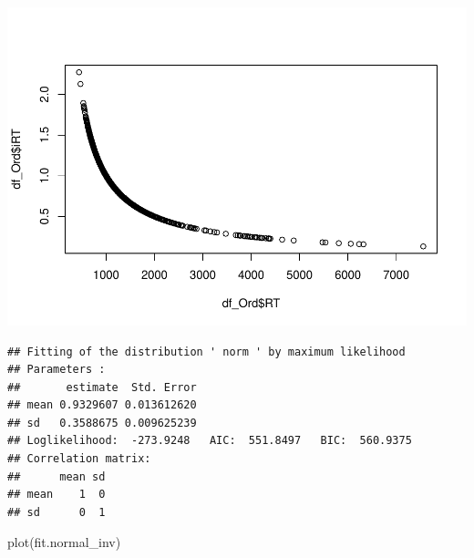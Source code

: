 \documentclass[
]{article}
\newenvironment{Shaded}{\begin{snugshade}}{\end{snugshade}}
\newcommand{\AttributeTok}[1]{\textcolor[rgb]{0.77,0.63,0.00}{#1}}
\newcommand{\CommentTok}[1]{\textcolor[rgb]{0.56,0.35,0.01}{\textit{#1}}}
\newcommand{\FunctionTok}[1]{\textcolor[rgb]{0.00,0.00,0.00}{#1}}
\newcommand{\NormalTok}[1]{#1}
\newcommand{\OtherTok}[1]{\textcolor[rgb]{0.56,0.35,0.01}{#1}}
\newcommand{\SpecialCharTok}[1]{\textcolor[rgb]{0.00,0.00,0.00}{#1}}
\newcommand{\StringTok}[1]{\textcolor[rgb]{0.31,0.60,0.02}{#1}}
\begin{document}
\includegraphics{01_CSI_online_aphasia_power_analysis_summary_files/figure-latex/RT distributions-2.pdf}

\begin{Shaded}
\end{Shaded}

\begin{verbatim}
## Fitting of the distribution ' norm ' by maximum likelihood 
## Parameters : 
##       estimate  Std. Error
## mean 0.9329607 0.013612620
## sd   0.3588675 0.009625239
## Loglikelihood:  -273.9248   AIC:  551.8497   BIC:  560.9375 
## Correlation matrix:
##      mean sd
## mean    1  0
## sd      0  1
\end{verbatim}

\begin{Shaded}
\begin{Highlighting}[]
\FunctionTok{plot}\NormalTok{(fit.normal\_inv)}
\end{Highlighting}
\end{Shaded}
\end{document}
